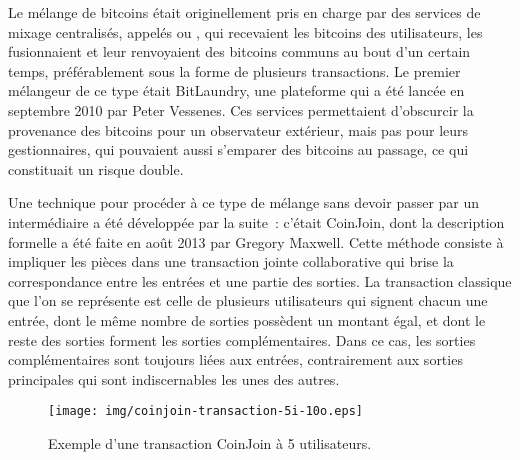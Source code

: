 Le mélange de bitcoins était originellement pris en charge par des services de mixage centralisés, appelés  ou , qui recevaient les bitcoins des utilisateurs, les fusionnaient et leur renvoyaient des bitcoins communs au bout d'un certain temps, préférablement sous la forme de plusieurs transactions. Le premier mélangeur de ce type était BitLaundry, une plateforme qui a été lancée en septembre 2010 par Peter Vessenes. Ces services permettaient d'obscurcir la provenance des bitcoins pour un observateur extérieur, mais pas pour leurs gestionnaires, qui pouvaient aussi s'emparer des bitcoins au passage, ce qui constituait un risque double.  %

Une technique pour procéder à ce type de mélange sans devoir passer par un intermédiaire a été développée par la suite~: c'était CoinJoin, dont la description formelle a été faite en août 2013 par Gregory Maxwell. Cette méthode consiste à impliquer les pièces dans une transaction jointe collaborative qui brise la correspondance entre les entrées et une partie des sorties. La transaction classique que l'on se représente est celle de plusieurs utilisateurs qui signent chacun une entrée, dont le même nombre de sorties possèdent un montant égal, et dont le reste des sorties forment les sorties complémentaires. Dans ce cas, les sorties complémentaires sont toujours liées aux entrées, contrairement aux sorties principales qui sont indiscernables les unes des autres.

\begin{figure}[ht]
  \centering
  \texttt{[image: img/coinjoin-transaction-5i-10o.eps]}
  \caption{Exemple d'une transaction CoinJoin à 5 utilisateurs.}
  \label{fig:coinjoin-transaction}
\end{figure}

